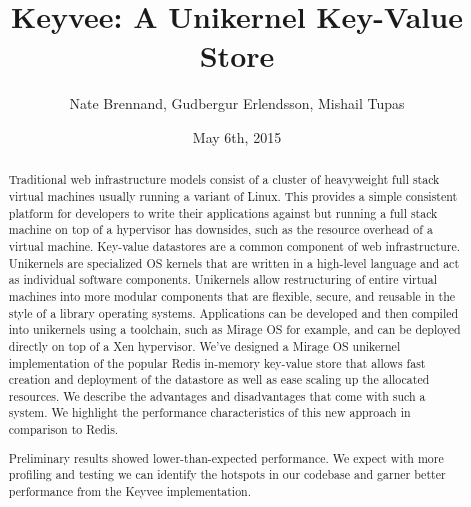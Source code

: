 \documentclass[english,10pt,twocolumn]{article}
\begin{document}
\title{Keyvee: A Unikernel Key-Value Store}
\author{Nate Brennand, Gudbergur Erlendsson, Mishail Tupas}
\date{May 6th, 2015}
\maketitle
\thispagestyle{empty}


\begin{abstract}
Traditional web infrastructure models consist of a cluster of heavyweight full stack virtual machines usually running a variant of Linux.
This provides a simple consistent platform for developers to write their applications against but running a full stack machine on top of a hypervisor has downsides, such as the resource overhead of a virtual machine.
Key-value datastores are a common component of web infrastructure.
Unikernels are specialized OS kernels that are written in a high-level language and act as individual software components.
Unikernels allow restructuring of entire virtual machines into more modular components that are flexible, secure, and reusable in the style of a library operating systems. Applications can be developed and then compiled into unikernels using a toolchain, such as Mirage OS for example, and can be deployed directly on top of a Xen hypervisor.
We've designed a Mirage OS\cite{mirage} unikernel implementation of the popular Redis\cite{redis} in-memory key-value store that allows fast creation and deployment of the datastore as well as ease scaling up the allocated resources.
We describe the advantages and disadvantages that come with such a system.
We highlight the performance characteristics of this new approach in comparison to Redis.

Preliminary results showed lower-than-expected performance.
We expect with more profiling and testing we can identify the hotspots in our codebase and garner better performance from the Keyvee implementation.
\end{abstract}
\end{document}
